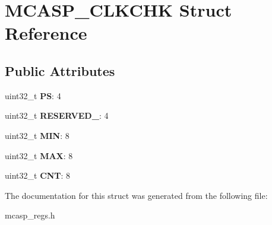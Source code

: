 \hypertarget{structMCASP__CLKCHK}{\section{M\-C\-A\-S\-P\-\_\-\-C\-L\-K\-C\-H\-K Struct Reference}
\label{structMCASP__CLKCHK}
}
\subsection*{Public Attributes}
\begin{DoxyCompactItemize}
\item 
\hypertarget{structMCASP__CLKCHK_a46608fcf5acded493a38f1312246d19f}{uint32\-\_\-t {\bfseries P\-S}\-: 4}\label{structMCASP__CLKCHK_a46608fcf5acded493a38f1312246d19f}

\item 
\hypertarget{structMCASP__CLKCHK_aa7ab531ff90ab65d355b5493639e6891}{uint32\-\_\-t {\bfseries R\-E\-S\-E\-R\-V\-E\-D\-\_}\-: 4}\label{structMCASP__CLKCHK_aa7ab531ff90ab65d355b5493639e6891}

\item 
\hypertarget{structMCASP__CLKCHK_a2d3946c904e72955da38b3a20b646a7f}{uint32\-\_\-t {\bfseries M\-I\-N}\-: 8}\label{structMCASP__CLKCHK_a2d3946c904e72955da38b3a20b646a7f}

\item 
\hypertarget{structMCASP__CLKCHK_a4a4a47a79c00f4b0760ee526b4eefa23}{uint32\-\_\-t {\bfseries M\-A\-X}\-: 8}\label{structMCASP__CLKCHK_a4a4a47a79c00f4b0760ee526b4eefa23}

\item 
\hypertarget{structMCASP__CLKCHK_a726deb70a37782471778e10067bc0589}{uint32\-\_\-t {\bfseries C\-N\-T}\-: 8}\label{structMCASP__CLKCHK_a726deb70a37782471778e10067bc0589}

\end{DoxyCompactItemize}


The documentation for this struct was generated from the following file\-:\begin{DoxyCompactItemize}
\item 
mcasp\-\_\-regs.\-h\end{DoxyCompactItemize}
